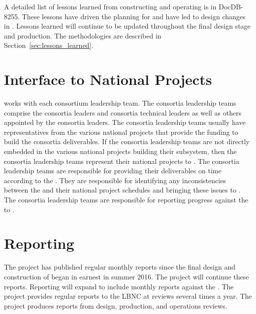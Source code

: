 A detailed list of lessons learned from constructing and operating
 is in DocDB-8255. These lessons have
driven the planning for  and have led to design changes in
. Lessons learned will continue to be updated throughout the final
design stage and production. The methodologies are described in
Section~\ref{sec:lessons_learned}.

\section{Interface to National Projects}
\label{sec:fdsp-coord-national}

  works with each consortium leadership team. The
consortia leadership teams comprise the consortia leaders and 
consortia technical leaders as well as others appointed by the consortia
leaders. The consortia leadership teams usually have representatives
from the various national projects that provide the funding to build the consortia
deliverables. If the consortia leadership teams are not directly
embedded in the various national projects building their subsystem,
then the consortia leadership teams represent their national projects
to . The consortia leadership teams are responsible for
providing their deliverables on time according to the
. They are responsible for identifying any inconsistencies
between the  and their national project schedules and
bringing these issues to . The consortia leadership teams
are responsible for reporting progress against the  to
.

\section{Reporting}
\label{sec:fdsp-coord-reporting}

The  project has published regular monthly reports since
the final design and construction of  began in
earnest in summer 2016. The project will continue these
reports. Reporting will expand to include monthly reports against the
. The  project provides regular reports to the
LBNC at reviews several times a year. The  project
produces reports from design, production, and operations reviews.



